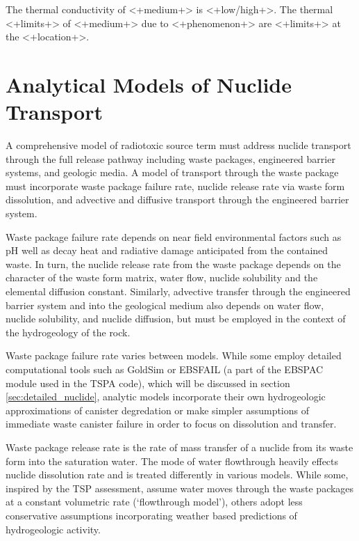 {The thermal conductivity of <+medium+> is <+low/high+>. The thermal  <+limits+> 
of <+medium+> due to <+phenomenon+> are <+limits+> at the <+location+>.




\section{Analytical Models of Nuclide Transport} \label{sec:analytical_nuc}






A comprehensive model of radiotoxic source term must address nuclide transport
through the full release pathway including waste packages, engineered barrier
systems, and geologic media. A model of transport through the waste package
must incorporate waste package failure rate, nuclide release rate via waste
form dissolution, and advective and diffusive transport through the 
engineered barrier system.  

Waste package failure rate depends on near field environmental factors such as
pH well as decay heat and radiative damage anticipated from the
contained waste.  In turn, the nuclide release rate from the waste package
depends on the character of the waste form matrix, water flow,
nuclide solubility and the elemental diffusion constant.  Similarly, advective
transfer through the engineered barrier system and into the geological medium
also depends on water flow, nuclide solubility, and nuclide diffusion, but must
be employed in the context of the hydrogeology of the rock.   

Waste package failure rate varies between models. While some employ detailed 
computational tools such as GoldSim or EBSFAIL (a part of the EBSPAC module 
used in the TSPA code), which will be discussed in section 
\ref{sec:detailed_nuclide}, 
analytic models incorporate their own hydrogeologic approximations of
canister degredation or make simpler assumptions of immediate waste canister 
failure in order to focus on dissolution and transfer. 

Waste package release rate is the rate of mass transfer of a nuclide from its
waste form into the saturation water. The mode of water flowthrough heavily
effects nuclide dissolution rate and is treated differently in various models.
While some, inspired by the TSP assessment, assume water moves through the
waste packages at a constant volumetric rate (`flowthrough model'), others
adopt less conservative assumptions incorporating weather based predictions of
hydrogeologic activity.

}

